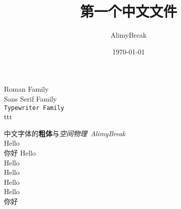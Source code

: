 \documentclass[12pt]{article}  %
\title{第一个中文文件}
\author{\kaishu AlimyBreak}
\date{\today}
\begin{document}
\maketitle
\textrm{Roman Family}	\\
\textsf{Sans Serif Family}\\
\texttt{Typewriter Family}\\


{\ttfamily} ttt



{中文字体的\textbf{粗体}与\textit{空间物理~AlimyBreak}}\\
{\tiny Hello}\\
{\scriptsize 你好 Hello}\\
{\footnotesize{Hello}}\\
{\small Hello}\\
{\normalsize Hello}\\
{\large Hello}\\

 你好
\end{document}
